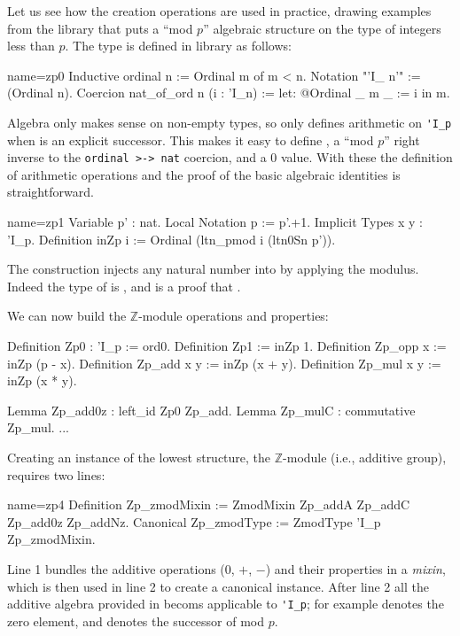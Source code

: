 Let us see how the creation operations are used in practice, drawing
examples from the  library that puts a ``mod $p$'' algebraic
structure on the type  of integers less than $p$.
The  type is defined in library  as follows:

\begin{coq}{name=zp0}{}
Inductive ordinal n := Ordinal m of m < n.
Notation "'I_ n'" := (Ordinal n).
Coercion nat_of_ord n (i : 'I_n) := let: @Ordinal _ m _ := i in m.
\end{coq}

Algebra only makes sense on non-empty types, so  only defines
arithmetic on \lstinline/'I_p/ when  is an explicit successor.
This makes it easy to define , a ``mod $p$'' right inverse to
the \lstinline/ordinal >-> nat/ coercion, and a 0 value. With these
the definition of arithmetic operations and the proof of the basic
algebraic identities is straightforward.

\begin{coq}{name=zp1}{}
Variable p' : nat.
Local Notation p := p'.+1.
Implicit Types x y : 'I_p.
Definition inZp i := Ordinal (ltn_pmod i (ltn0Sn p')).
\end{coq}
The  construction injects any natural number 
into  by applying the modulus.  Indeed the
type of  is ,
and  is a proof that .

We can now build the $\mathbb{Z}$-module operations and
properties:

\begin{coq}{}{}
Definition Zp0 : 'I_p := ord0.
Definition Zp1 := inZp 1.
Definition Zp_opp x := inZp (p - x).
Definition Zp_add x y := inZp (x + y).
Definition Zp_mul x y := inZp (x * y).

Lemma Zp_add0z : left_id Zp0 Zp_add.
Lemma Zp_mulC : commutative Zp_mul.
...
\end{coq}

Creating an instance of the lowest  structure, the
$\mathbb{Z}$-module (i.e., additive group), requires two lines:

\begin{coq}{name=zp4}{}
Definition Zp_zmodMixin := ZmodMixin Zp_addA Zp_addC Zp_add0z Zp_addNz.
Canonical Zp_zmodType := ZmodType 'I_p Zp_zmodMixin.
\end{coq}

Line 1 bundles the additive operations (0, $+$, $-$) and their
properties in a \emph{mixin}, which is then used in line 2 to create a
canonical instance. After line 2 all the additive algebra provided in
 becoms applicable to \lstinline/'I_p/; for example 
denotes the zero element, and  denotes the successor of  mod $p$.

